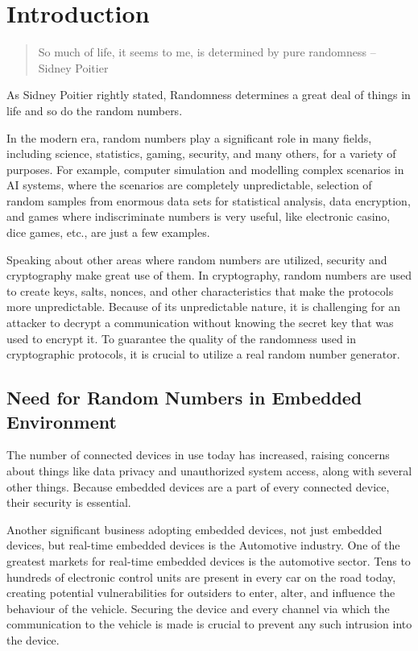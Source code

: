 \chapter{Introduction}
\label{ch:intro}

\begin{quote}
So much of life, it seems to me, is determined by pure randomness –  Sidney Poitier	
\end{quote} 

As Sidney Poitier rightly stated, Randomness determines a great deal of things in life and so do the random numbers.\cite{Charan:2002} 

In the modern era, random numbers play a significant role in many fields, including science, statistics, gaming, security, and many others, for a variety of purposes. For example, computer simulation and modelling complex scenarios in AI systems, where the scenarios are completely unpredictable, selection of random samples from enormous data sets for statistical analysis, data encryption, and games where indiscriminate numbers is very useful, like electronic casino, dice games, etc., are just a few examples.

Speaking about other areas where random numbers are utilized, security and cryptography make great use of them. In cryptography, random numbers are used to create keys, salts, nonces, and other characteristics that make the protocols more unpredictable. Because of its unpredictable nature, it is challenging for an attacker to decrypt a communication without knowing the secret key that was used to encrypt it. To guarantee the quality of the randomness used in cryptographic protocols, it is crucial to utilize a real random number generator.


%
%
\section{Need for Random Numbers in Embedded Environment}
\label{sec:intro:Need for Random Numbers in Embedded Environment}

The number of connected devices in use today has increased, raising concerns about things like data privacy and unauthorized system access, along with several other things. Because embedded devices are a part of every connected device, their security is essential. 

Another significant business adopting embedded devices, not just embedded devices, but real-time embedded devices is the Automotive industry. One of the greatest markets for real-time embedded devices is the automotive sector. Tens to hundreds of electronic control units are present in every car on the road today, creating potential vulnerabilities for outsiders to enter, alter, and influence the behaviour of the vehicle. Securing the device and every channel via which the communication to the vehicle is made is crucial to prevent any such intrusion into the device.

